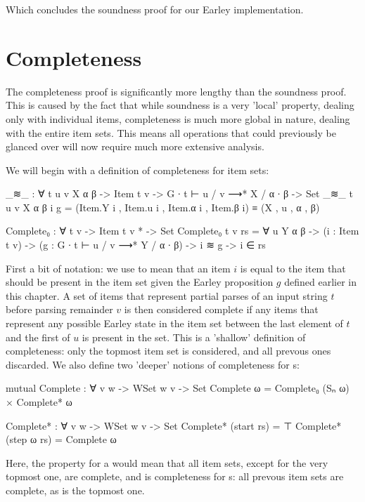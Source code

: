 		Which concludes the soundness proof for our Earley implementation.

	\section{Completeness}

		The completeness proof is significantly more lengthy than the soundness
		proof. This is caused by the fact that while soundness is a very
		'local' property, dealing only with individual items, completeness is
		much more global in nature, dealing with the entire item sets. This
		means all operations that could previously be glanced over will now
		require much more extensive analysis.

		We will begin with a definition of completeness for item sets:

		\begin{code}
			_≋_ : ∀ {t u v X α β} -> Item t v -> G ∙ t ⊢ u / v ⟶* X / α ∙ β -> Set
			_≋_ {t} {u} {v} {X} {α} {β} i g =
				(Item.Y i , Item.u i , Item.α i , Item.β i) ≡ (X , u , α , β)

			Complete₀ : ∀ {t v} -> Item t v * -> Set
			Complete₀ {t} {v} rs = ∀ {u Y α β} ->
			  (i : Item t v) ->
			  (g : G ∙ t ⊢ u / v ⟶* Y / α ∙ β) ->
			  i ≋ g ->
			  i ∈ rs
		\end{code}

		First a bit of notation: we use  to mean that an item $i$
		is equal to the item that should be present in the item set given the
		Earley proposition $g$ defined earlier in this chapter. A set of items
		that represent partial parses of an input string $t$ before parsing
		remainder $v$ is then considered complete if any items that represent
		any possible Earley state in the item set between the last element of
		$t$ and the first of $u$ is present in the set. This is a 'shallow'
		definition of completeness: only the topmost item set is considered,
		and all prevous ones discarded. We also define two 'deeper' notions of
		completeness for s:

		\begin{code}
			mutual
			  Complete : ∀ {v w} -> WSet w v -> Set
			  Complete ω = Complete₀ (Sₙ ω) × Complete* ω

			  Complete* : ∀ {v w} -> WSet w v -> Set
			  Complete* (start rs) = ⊤
			  Complete* (step ω rs) = Complete ω
		\end{code}

		Here, the  property for a  would mean
		that all item sets, except for the very topmost one, are complete, and
		 is completeness for s: all prevous item
		sets are complete, as is the topmost one.

